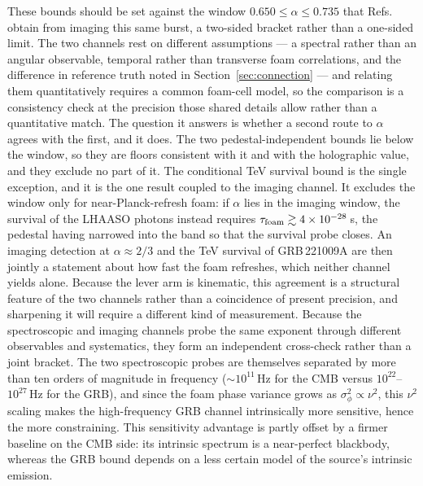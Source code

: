 \documentclass[aps,prd,onecolumn,amsmath,amssymb]{revtex4-2}
\begin{document}
These bounds should be set against the window
$0.650\leq\alpha\leq0.735$ that Refs.~\cite{Steinbring2023,SteinbringNg2026}
obtain from imaging this same burst, a two-sided bracket rather than a
one-sided limit.  The two channels rest on different assumptions --- a
spectral rather than an angular observable, temporal rather than transverse
foam correlations, and the difference in reference truth noted in
Section~\ref{sec:connection} --- and relating them quantitatively requires a
common foam-cell model, so the comparison is a consistency check at the
precision those shared details allow rather than a quantitative match.  The
question it answers is whether a second route to $\alpha$ agrees with the
first, and it does.  The two pedestal-independent bounds lie below the window,
so they are floors consistent with it and with the holographic value, and they
exclude no part of it.  The conditional TeV survival bound is the single
exception, and it is the one result coupled to the imaging channel.  It
excludes the window only for near-Planck-refresh foam: if $\alpha$ lies in the
imaging window, the survival of the LHAASO photons instead requires
$\tau_{\rm foam}\gtrsim4\times10^{-28}$\,s, the pedestal having narrowed into
the band so that the survival probe closes.  An imaging detection at
$\alpha\approx2/3$ and the TeV survival of GRB\,221009A are then jointly a
statement about how fast the foam refreshes, which neither channel yields
alone.  Because the lever arm is kinematic, this agreement is a structural
feature of the two channels rather than a coincidence of present precision,
and sharpening it will require a different kind of measurement.
Because the spectroscopic and imaging channels probe the same exponent through
different observables and systematics, they form an
independent cross-check rather than a joint bracket.  The two
spectroscopic probes are themselves separated
by more than ten orders of magnitude in frequency ($\sim10^{11}$\,Hz for
the CMB versus $10^{22}$--$10^{27}$\,Hz for the GRB), and since the foam
phase variance grows as $\sigma_\phi^2\propto\nu^2$, this $\nu^2$ scaling
makes the high-frequency GRB channel intrinsically more sensitive, hence
the more constraining.  This
sensitivity advantage is partly offset by a firmer baseline on the CMB
side: its intrinsic spectrum is a near-perfect blackbody, whereas the GRB
bound depends on a less certain model of the source's intrinsic emission.
\end{document}
